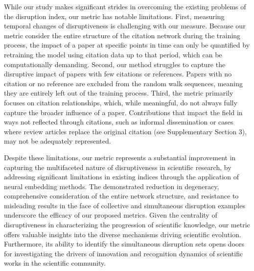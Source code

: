 \documentclass[12pt]{article}
\begin{document}
While our study makes significant strides in overcoming the existing problems of the disruption index, our metric has notable limitations. First, measuring temporal changes of disruptiveness is challenging with our measure. Because our metric consider the entire structure of the citation network during the training process, the impact of a paper at specific points in time can only be quantified by retraining the model using citation data up to that period, which can be computationally demanding. Second, our method struggles to capture the disruptive impact of papers with few citations or references. Papers with no citation or no reference are excluded from the random walk sequences, meaning they are entirely left out of the training process. Third, the metric primarily focuses on citation relationships, which, while meaningful, do not always fully capture the broader influence of a paper. Contributions that impact the field in ways not reflected through citations, such as informal dissemination or cases where review articles replace the original citation (see Supplementary Section 3), may not be adequately represented.


Despite these limitations, our metric represents a substantial improvement in capturing the multifaceted nature of disruptiveness in scientific research, by addressing significant limitations in existing indices through the application of neural embedding methods. The demonstrated reduction in degeneracy, comprehensive consideration of the entire network structure, and resistance to misleading results in the face of collective and simultaneous disruption examples underscore the efficacy of our proposed metrics. Given the centrality of disruptiveness in characterizing the progression of scientific knowledge, our metric offers valuable insights into the diverse mechanisms driving scientific evolution. Furthermore, its ability to identify the simultaneous disruption sets opens doors for investigating the drivers of innovation and recognition dynamics of scientific works in the scientific community.





\printbibliography[ title={References}]
\end{document}
